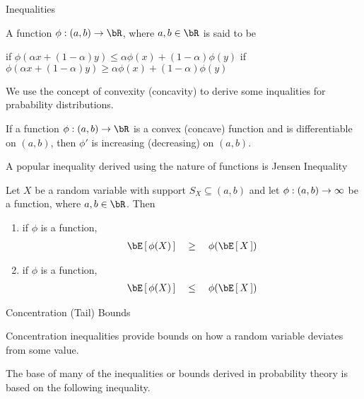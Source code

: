\documentclass{article}
\begin{document}
\begin{ssection}{Inequalities}

	\begin{definition}
		A function $\phi : (a, b) \ra \bR$, where $a, b \in \bR$ is said to be

		\begin{enumerate}[label=(\roman*)]
			\ditem[convex]\;\: if $\phi(\alpha x + (1 - \alpha) y) \le \alpha \phi(x) + (1 - \alpha) \phi(y)$
			\ditem[concave] if $\phi(\alpha x + (1 - \alpha) y) \ge \alpha \phi(x) + (1 - \alpha) \phi(y)$
		\end{enumerate}
	\end{definition}

	We use the concept of convexity (concavity) to derive some inqualities for prabability distributions.

	\begin{result}
		If a function $\phi : (a, b) \ra \bR$ is a convex (concave) function and is differentiable on $(a, b)$, then $\phi'$ is increasing (decreasing) on $(a, b)$.
	\end{result}

	A popular inequality derived using the nature of functions is Jensen Inequality \br

	\begin{result}
		Let $X$ be a random variable with support $S_X \subseteq (a, b)$ and let $\phi : (a, b) \rightarrow \infty$ be a function, where $a, b \in \bR$. Then

		\begin{enumerate}
			\item if $\phi$ is a  function,
				\begin{align*}
					\E{\phi(X)}	\qge	\phi(\E{X})
				\end{align*}
			\item if $\phi$ is a  function,
				\begin{align*}
					\E{\phi(X)}	\qle	\phi(\E{X})
				\end{align*}
		\end{enumerate}
	\end{result}

	\begin{ssubsection}{Concentration (Tail) Bounds}

		Concentration inequalities provide bounds on how a random variable deviates from some value. \br

		The base of many of the inequalities or bounds derived in probability theory is based on the following inequality.


\end{ssubsection}
\end{ssection}
\end{document}
